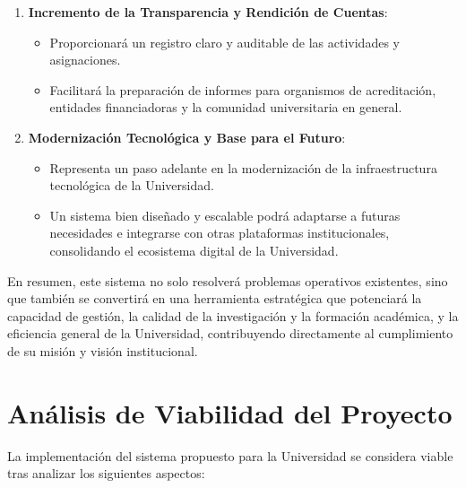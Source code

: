 \begin{enumerate}
\item \textbf{Incremento de la Transparencia y Rendición de Cuentas}:
\begin{itemize}
\item Proporcionará un registro claro y auditable de las actividades y asignaciones.
\item Facilitará la preparación de informes para organismos de acreditación, entidades financiadoras y la comunidad universitaria en general.
\end{itemize}

\item\textbf{Modernización Tecnológica y Base para el Futuro}:

\begin{itemize}
\item Representa un paso adelante en la modernización de la infraestructura tecnológica de la Universidad.
\item Un sistema bien diseñado y escalable podrá adaptarse a futuras necesidades e integrarse con otras plataformas institucionales, consolidando el ecosistema digital de la Universidad.
\end{itemize}
\end{enumerate}
En resumen, este sistema no solo resolverá problemas operativos existentes, sino que también se convertirá en una herramienta estratégica que potenciará la capacidad de gestión, la calidad de la investigación y la formación académica, y la eficiencia general de la Universidad, contribuyendo directamente al cumplimiento de su misión y visión institucional.

\section{Análisis de Viabilidad del Proyecto}
La implementación del sistema propuesto para la Universidad se considera viable tras analizar los siguientes aspectos:

